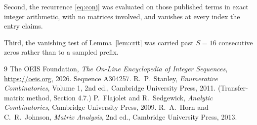 \documentclass[11pt,a4paper]{article}
\theoremstyle{plain}
\theoremstyle{definition}
\begin{document}
Second, the recurrence \eqref{eq:conj} was evaluated on those published terms in exact
integer arithmetic, with no matrices involved, and vanishes at every index the entry claims.

Third, the vanishing test of Lemma~\ref{lem:crit} was carried past $S=16$ consecutive
zeros rather than to a sampled prefix.

\begin{thebibliography}{9}
 The OEIS Foundation, \emph{The On-Line Encyclopedia of Integer
Sequences}, \url{https://oeis.org}, 2026. Sequence A304257.
 R.~P.~Stanley, \emph{Enumerative Combinatorics}, Volume 1, 2nd ed.,
Cambridge University Press, 2011. (Transfer-matrix method, Section 4.7.)
 P.~Flajolet and R.~Sedgewick, \emph{Analytic Combinatorics}, Cambridge
University Press, 2009.
 R.~A.~Horn and C.~R.~Johnson, \emph{Matrix Analysis}, 2nd ed., Cambridge
University Press, 2013.
\end{thebibliography}
\end{document}
